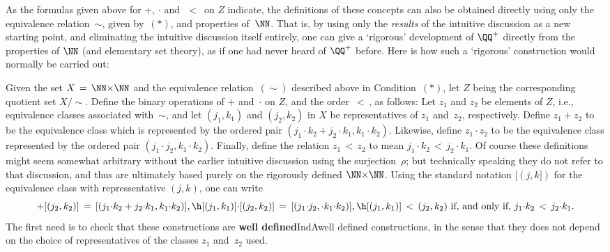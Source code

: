 {{{        As the formulas given above for $+$, ${\cdot}$ and~$\,<\,$ on $Z$ indicate,
    the definitions of these concepts can also be obtained directly using only the equivalence relation~$\sim$, given by~$({\ast})$, and properties of~${\NN}$.
    That is, by using only the {\em results} of the intuitive discussion as a new starting point, and eliminating the intuitive discussion itself entirely,
    one can give a `rigorous' development of ${\QQ}^{+}$ directly from the properties of ${\NN}$ (and elementary set theory),
    as if one had never heard of ${\QQ}^{+}$ before. Here is how such a `rigorous' construction would normally be carried out:

        Given the set $X \,=\, {\NN}{\times}{\NN}$ and the equivalence relation~$(\sim)$ described above in Condition~$({\ast})$,
    let $Z$ being the corresponding quotient set $X/\sim$. Define the binary operations of $+$ and~${\cdot}$ on $Z$, and the order $\,<\,$, as follows:
    Let $z_{1}$ and $z_{2}$ be elements of $Z$, i.e., equivalence classes associated with~${\sim}$,
    and let $(j_{1},k_{1})$ and $(j_{2},k_{2})$ in $X$ be representatives of $z_{1}$ and~$z_{2}$, respectively.
    Define $z_{1} + z_{2}$ to be the equivalence class which is represented by the ordered pair $(j_{1}{\cdot}k_{2} + j_{2}{\cdot}k_{1}, k_{1}{\cdot}k_{2})$.
    Likewise, define $z_{1}{\cdot}z_{2}$ to be the equivalence class represented by the ordered pair $(j_{1}{\cdot}j_{2}, k_{1}{\cdot}k_{2})$.
    Finally, define the relation $z_{1}\,<\,z_{2}$ to mean $j_{1}{\cdot}k_{2}\,<\,j_{2}{\cdot}k_{1}$.
    Of course these definitions might seem somewhat arbitrary without the earlier intuitive discussion using the surjection~${\rho}$;
    but technically speaking they do not refer to that discussion, and thus are ultimately based purely on the rigorously defined ${\NN}{\times}{\NN}$.
    Using the standard notation $[(j,k])$ for the equivalence class with repressentative $(j,k)$,
    one can write 
        \begin{displaymath}
        [(j_{1},k_{1})] + [(j_{2},k_{2})] \,=\, [(j_{1}{\cdot}k_{2} + j_{2}{\cdot}k_{1}, k_{1}{\cdot}k_{2})], \h
        [(j_{1},k_{1})]{\cdot}[(j_{2},k_{2})] \,=\, [(j_{1}{\cdot}j_{2},{\cdot} k_{1}{\cdot}k_{2})], \h
        [(j_{1},k_{1})] \,<\, {(j_{2},k_{2})} \mbox{ if, and only if, }
        j_{1}{\cdot}k_{2}\,<\,j_{2}{\cdot}k_{1}.
        \end{displaymath}
    The first need is to check that these constructions are {\bf well defined}IndA{well defined constructions},
    in the sense that they does not depend on the choice of representatives of the classes $z_{1}$ and~$z_{2}$ used.
}}}
